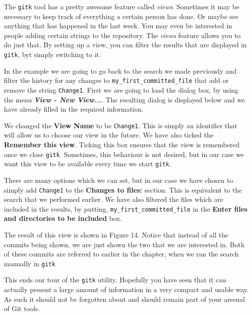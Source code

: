 The \texttt{gitk} tool has a pretty awesome feature called \emph{views}.
Sometimes it may be necessary to keep track of everything a certain person has done.
Or maybe see anything that has happened in the last week.
You may even be interested in people adding certain strings to the repository.
The \emph{views} feature allows you to do just that.
By setting up a view, you can filter the results that are displayed in \texttt{gitk}, byt simply switching to it.

In the example we are going to go back to the search we made previously and filter the history for any changes to \texttt{my\_first\_committed\_file} that add or remove the string \texttt{Change1}.
First we are going to load the dialog box, by using the menu \textbf{\emph{View - New View...}}.
The resulting dialog is displayed below and we have already filled in the required information.


We changed the \textbf{View Name} to be \texttt{Change1}.
This is simply an identifier that will allow us to choose our view in the future.
We have also ticked the \textbf{Remember this view}.
Ticking this box ensures that the view is remembered once we close \texttt{gitk}.
Sometimes, this behaviour is not desired, but in our case we want this view to be available every time we start \texttt{gitk}.

There are many options which we can set, but in our case we have chosen to simply add \texttt{Change1} to the \textbf{Changes to files:} section.
This is equivalent to the search that we performed earlier.
We have also filtered the files which are included in the results, by putting, \texttt{my\_first\_committed\_file} in the \textbf{Enter files and directories to be included} box.

The result of this view is shown in Figure 14.
Notice that instead of all the commits being shown, we are just shown the two that we are interested in.
Both of these commits are referred to earlier in the chapter, when we ran the search manually in \texttt{gitk}


This ends our tour of the \texttt{gitk} utility.
Hopefully you have seen that it can actually present a large amount of information in a very compact and usable way.
As such it should not be forgotten about and should remain part of your arsenal of Git tools.

